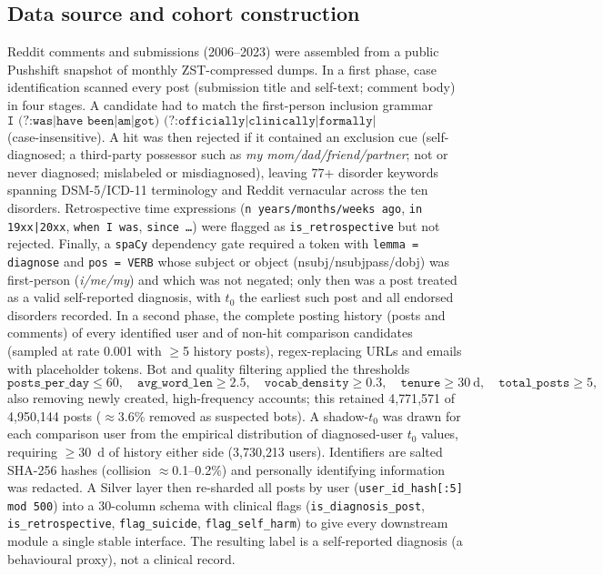 \documentclass[11pt]{article}
\begin{document}
\subsection*{Data source and cohort construction}
Reddit comments and submissions (2006--2023) were assembled from a public Pushshift snapshot of
monthly ZST-compressed dumps. In a first phase, case identification scanned every post (submission title and
self-text; comment body) in four stages. A candidate had to match the first-person inclusion
grammar
\begin{equation}
\texttt{I (?:was|have been|am|got) (?:officially|clinically|formally|professionally)? diagnosed with [\ldots]}
\label{eq:inc}
\end{equation}
(case-insensitive). A hit was then rejected if it contained an exclusion cue (self-diagnosed; a
third-party possessor such as \emph{my mom/dad/friend/partner}; not or never diagnosed;
mislabeled or misdiagnosed), leaving 77+ disorder keywords spanning DSM-5/ICD-11 terminology
and Reddit vernacular across the ten disorders. Retrospective time expressions
(\texttt{n years/months/weeks ago}, \texttt{in 19xx|20xx}, \texttt{when I was},
\texttt{since \ldots}) were flagged as \texttt{is\_retrospective} but not rejected. Finally, a
\texttt{spaCy} dependency gate required a token with \texttt{lemma = diagnose} and
\texttt{pos = VERB} whose subject or object (nsubj/nsubjpass/dobj) was first-person
(\emph{i/me/my}) and which was not negated; only then was a post treated as a valid
self-reported diagnosis, with $t_0$ the earliest such post and all endorsed disorders recorded.
In a second phase, the complete posting history (posts and comments) of every identified
user and of non-hit comparison candidates (sampled at rate 0.001 with $\ge$5 history posts),
regex-replacing URLs and emails with placeholder tokens. Bot and quality filtering applied the
thresholds
\begin{equation}
\texttt{posts\_per\_day}\le 60,\quad \texttt{avg\_word\_len}\ge 2.5,\quad
\texttt{vocab\_density}\ge 0.3,\quad \texttt{tenure}\ge 30~\mathrm{d},\quad \texttt{total\_posts}\ge 5,
\label{eq:bot}
\end{equation}
also removing newly created, high-frequency accounts; this retained 4{,}771{,}571 of
4{,}950{,}144 posts ($\approx$3.6\% removed as suspected bots). A shadow-$t_0$ was drawn for
each comparison user from the empirical distribution of diagnosed-user $t_0$ values, requiring $\ge$30~d
of history either side (3{,}730{,}213 users). Identifiers are salted SHA-256 hashes (collision
$\approx$0.1--0.2\%) and personally identifying information was redacted. A Silver layer then
re-sharded all posts by user (\texttt{user\_id\_hash[:5] mod 500}) into a 30-column schema with
clinical flags (\texttt{is\_diagnosis\_post}, \texttt{is\_retrospective}, \texttt{flag\_suicide},
\texttt{flag\_self\_harm}) to give every downstream module a single stable interface. The
resulting label is a self-reported diagnosis (a behavioural proxy), not a clinical record.
\end{document}
